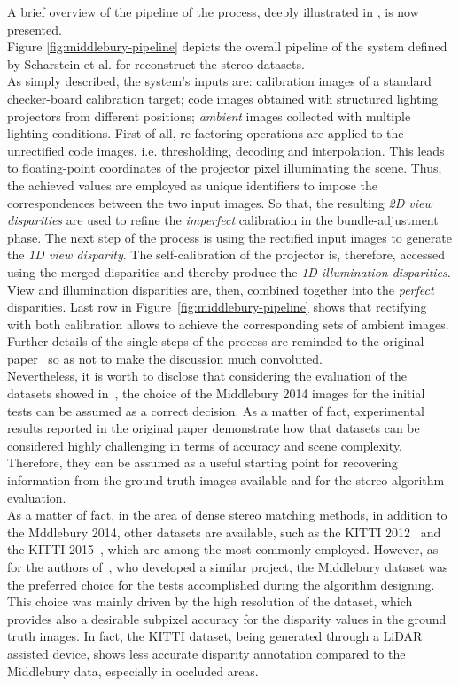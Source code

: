 A brief overview of the pipeline of the process, deeply illustrated in \cite{Scharstein2014}, is now presented.\\
Figure \ref{fig:middlebury-pipeline} depicts the overall pipeline of the system defined by Scharstein et al. \cite{Scharstein2014} for reconstruct the stereo datasets.\\
As simply described, the system's inputs are: calibration images of a standard checker-board calibration target; code images obtained with structured lighting projectors from different positions; \textit{ambient} images collected with multiple lighting conditions. 
First of all, re-factoring operations are applied to the unrectified code images, i.e. thresholding, decoding and interpolation.
This leads to floating-point coordinates of the projector pixel illuminating the scene. 
Thus, the achieved values are employed as unique identifiers to impose the correspondences between the two input images. 
So that, the resulting \textit{2D view disparities} are used to refine the \textit{imperfect} calibration in the bundle-adjustment phase.
The next step of the process is using the rectified input images to generate the \textit{1D view disparity}.
The self-calibration of the projector is, therefore, accessed using the merged disparities and thereby produce the \textit{1D illumination disparities}.
View and illumination disparities are, then, combined together into the \textit{perfect} disparities. 
Last row in Figure~\ref{fig:middlebury-pipeline} shows that rectifying with both calibration allows to achieve the corresponding sets of ambient images.\\
Further details of the single steps of the process are reminded to the original paper~\cite{Scharstein2014} so as not to make the discussion much convoluted.\\
Nevertheless, it is worth to disclose that considering the evaluation of the datasets showed in~\cite{Scharstein2014}, the choice of the Middlebury 2014 images for the initial tests can be assumed as a correct decision.
As a matter of fact, experimental results reported in the original paper demonstrate how that datasets can be considered highly challenging in terms of accuracy and scene complexity.
Therefore, they can be assumed as a useful starting point for recovering information from the ground truth images available and for the stereo algorithm evaluation.\\
As a matter of fact, in the area of dense stereo matching methods, in addition to the Mddlebury 2014, other datasets are available, such as the KITTI 2012~\cite{geiger2013vision} and the KITTI 2015~\cite{menze2015object}, which are among the most commonly employed.
However, as for the authors of~\cite{Keselman2017}, who developed a similar project, the Middlebury dataset was the preferred choice for the tests accomplished during the algorithm designing.
This choice was mainly driven by the high resolution of the dataset, which provides also a desirable subpixel accuracy for the disparity values in the ground truth images. 
In fact, the KITTI dataset, being generated through a LiDAR assisted device, shows less accurate disparity annotation compared to the Middlebury data, especially in occluded areas.

